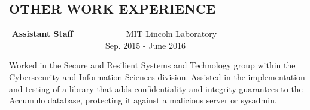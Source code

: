 \documentclass{res}
\begin{document}
\begin{resume}



\section{OTHER WORK EXPERIENCE}
\vspace{0in}
    \begin{tabbing}
   \hspace{3in}\=  \hspace{1.63in}\= \kill %
    {\bf Assistant Staff} \>~~~~~~~~~~~~MIT Lincoln Laboratory \>~~~~~~~~~~~~~~~~~~~~~~~Sep. 2015 - June 2016\\                       
   \end{tabbing}\vspace{-30pt}      %
    Worked in the Secure and Resilient Systems and Technology group within the Cybersecurity and Information Sciences division.  Assisted in the implementation and testing of a library that adds confidentiality and integrity guarantees to the Accumulo database, protecting it against a malicious server or sysadmin.


\end{resume}
\end{document}
